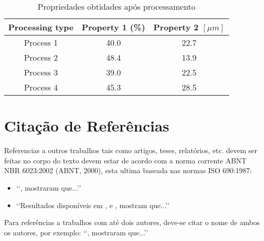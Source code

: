 \begin{table}[h]
	\centering
	\caption{Propriedades obtidades após processamento}
	\label{tab01}
	
	\begin{tabular}{ccc}
		\toprule
		\textbf{Processing type} & \textbf{Property 1} (\%) & 
		\textbf{Property 2} $[\mu m]$ \\
		\midrule
		Process 1 & 40.0 & 22.7 \\
		Process 2 & 48.4 & 13.9 \\
		Process 3 & 39.0 & 22.5 \\
		Process 4 & 45.3 & 28.5 \\
		\bottomrule
	\end{tabular}
\end{table}

\section{Citação de Referências}

Referencias a outros trabalhos tais como artigos, teses, relatórios, etc. devem 
ser feitas no corpo do texto devem estar de acordo com a norma corrente ABNT 
NBR 6023:2002 (ABNT, 2000), esta ultima baseada nas normas ISO 690:1987:
\begin{itemize}
	\item \lq\lq {}, mostraram que...\rq\rq

	\item \lq\lq Resultados disponíveis em \cite{coimbra1978}, \cite{clark1986} 
	e \cite{sparrow1980}, mostram que...\rq\rq
\end{itemize}

Para referências a trabalhos com até dois autores, deve-se citar o nome de 
ambos os autores, por exemplo: \lq\lq {}, mostraram 
que...\rq\rq

